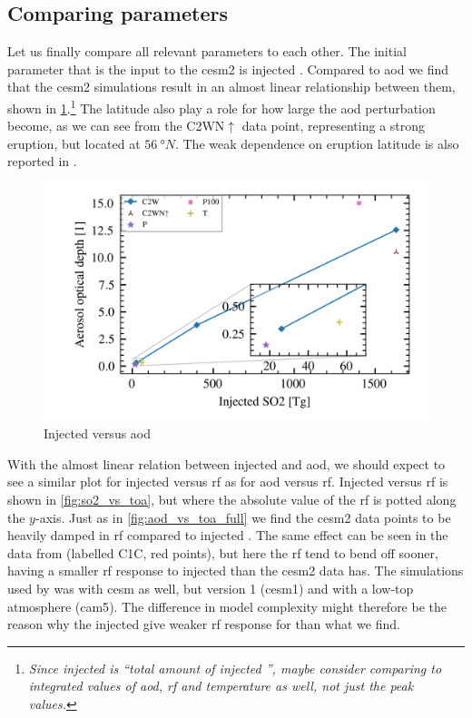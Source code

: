 \documentclass{ametsocV5}
\newcommand{\iso}[1][i]{{#1}njected \ce{SO2}}
\begin{document}
\subsection{Comparing parameters}

Let us finally compare all relevant parameters to each other. The initial parameter that
is the input to the \acrshort{cesm2} is injected . Compared to \acrshort{aod} we
find that the \acrshort{cesm2} simulations result in an almost linear relationship
between them, shown in \cref{fig:so2_vs_aod}.\footnote{\emph{Since \iso{} is ``total
    amount of \iso{}'', maybe consider comparing to integrated values of \acrshort{aod},
    \acrshort{rf} and temperature as well, not just the peak values.}} The latitude also
play a role for how large the \acrshort{aod} perturbation become, as we can see from the
C2WN\(\uparrow\) data point, representing a strong eruption, but located at \(
\SI{56}{\degree N} \). The weak dependence on eruption latitude is also reported in
\citet{marshall2019}.

\begin{figure}[t]
  \begin{center}
    \includegraphics[width=0.95\linewidth]{figures/injection_vs_aod.png}
  \end{center}
  \caption{Injected  versus \acrshort{aod}}%
  \label{fig:so2_vs_aod}
\end{figure}

With the almost linear relation between injected  and \acrshort{aod}, we should
expect to see a similar plot for \iso{} versus \acrshort{rf} as for \acrshort{aod}
versus \acrshort{rf}. \iso[I] versus \acrshort{rf} is shown in \cref{fig:so2_vs_toa},
but where the absolute value of the \acrshort{rf} is potted along the \( y \)-axis. Just
as in \cref{fig:aod_vs_toa_full} we find the \acrshort{cesm2} data points to be heavily
damped in \acrshort{rf} compared to \iso. The same effect can be seen in the data from
\citet{ottobliesner2016} (labelled C1C, red points), but here the \acrshort{rf} tend to
bend off sooner, having a smaller \acrshort{rf} response to \iso{} than the
\acrshort{cesm2} data has. The simulations used by \citet{ottobliesner2016} was with
\acrshort{cesm} as well, but version 1 (\acrshort{cesm1}) and with a low-top atmosphere
(\acrshort{cam5}). The difference in model complexity might therefore be the reason why
the \iso{} give weaker \acrshort{rf} response for \citet{ottobliesner2016} than what we
find.
\end{document}
